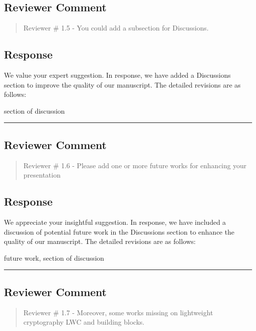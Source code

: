 \subsection{Reviewer Comment}
\begin{mdframed}
	\begin{quote}
		Reviewer \# 1.5 - You could add a subsection for Discussions.
	\end{quote}
\end{mdframed}

\subsection{Response}

We value your expert suggestion. In response, we have added a Discussions section to improve the quality of our manuscript. The detailed revisions are as follows:

\color{blue}
section of discussion

\color{black}

\noindent\rule{\linewidth}{2.0pt}

\subsection{Reviewer Comment}
\begin{mdframed}
	\begin{quote}
		Reviewer \# 1.6 - Please add one or more future works for enhancing your presentation
	\end{quote}
\end{mdframed}

\subsection{Response}

We appreciate your insightful suggestion. In response, we have included a discussion of potential future work in the Discussions section to enhance the quality of our manuscript. The detailed revisions are as follows:

\color{blue}

future work, section of discussion

\color{black}

\noindent\rule{\linewidth}{2.0pt}

\subsection{Reviewer Comment}
\begin{mdframed}
	\begin{quote}
		Reviewer \# 1.7 - Moreover, some works missing on lightweight cryptography LWC and building blocks.
	\end{quote}
\end{mdframed}

